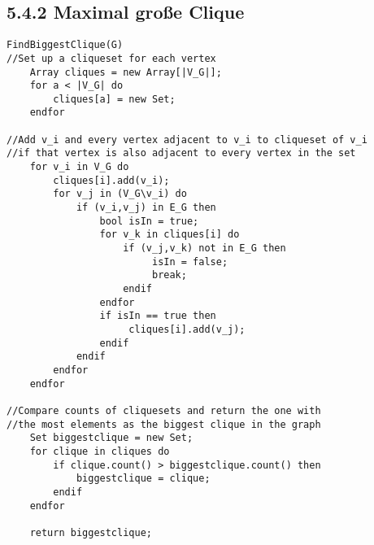 \subsection*{5.4.2 Maximal große Clique}
\begin{lstlisting}
FindBiggestClique(G)
//Set up a cliqueset for each vertex
    Array cliques = new Array[|V_G|];
    for a < |V_G| do
        cliques[a] = new Set;
    endfor
    
//Add v_i and every vertex adjacent to v_i to cliqueset of v_i
//if that vertex is also adjacent to every vertex in the set
    for v_i in V_G do
        cliques[i].add(v_i);
        for v_j in (V_G\v_i) do
            if (v_i,v_j) in E_G then
                bool isIn = true;
                for v_k in cliques[i] do
                    if (v_j,v_k) not in E_G then
                	     isIn = false;
                	     break;
                    endif
                endfor
                if isIn == true then
                     cliques[i].add(v_j);
                endif
            endif
        endfor
    endfor
    
//Compare counts of cliquesets and return the one with
//the most elements as the biggest clique in the graph
    Set biggestclique = new Set;
    for clique in cliques do
        if clique.count() > biggestclique.count() then
            biggestclique = clique;
        endif
    endfor
    
    return biggestclique;
\end{lstlisting}
